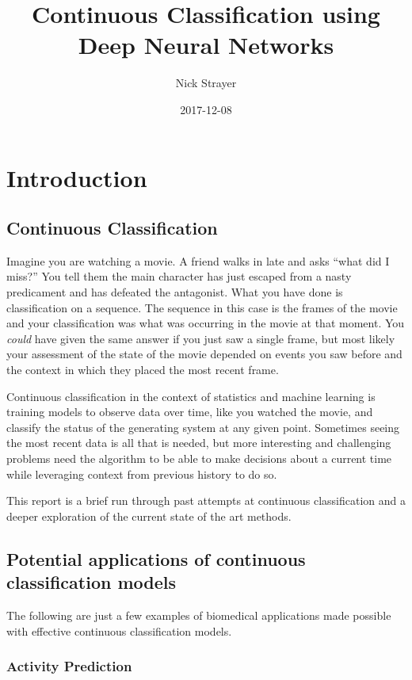 \documentclass[]{book}
\title{Continuous Classification using Deep Neural Networks}
\author{Nick Strayer}
\date{2017-12-08}
\theoremstyle{definition}
\theoremstyle{definition}
\theoremstyle{definition}
\theoremstyle{remark}
\begin{document}
\maketitle

{
\setcounter{tocdepth}{1}
\tableofcontents
}
\chapter{Introduction}\label{intro}

\section{Continuous Classification}\label{continuous-classification}

Imagine you are watching a movie. A friend walks in late and asks ``what
did I miss?'' You tell them the main character has just escaped from a
nasty predicament and has defeated the antagonist. What you have done is
classification on a sequence. The sequence in this case is the frames of
the movie and your classification was what was occurring in the movie at
that moment. You \emph{could} have given the same answer if you just saw
a single frame, but most likely your assessment of the state of the
movie depended on events you saw before and the context in which they
placed the most recent frame.

Continuous classification in the context of statistics and machine
learning is training models to observe data over time, like you watched
the movie, and classify the status of the generating system at any given
point. Sometimes seeing the most recent data is all that is needed, but
more interesting and challenging problems need the algorithm to be able
to make decisions about a current time while leveraging context from
previous history to do so.

This report is a brief run through past attempts at continuous
classification and a deeper exploration of the current state of the art
methods.

\section{Potential applications of continuous classification
models}\label{potential-applications-of-continuous-classification-models}

The following are just a few examples of biomedical applications made
possible with effective continuous classification models.

\subsection{Activity Prediction}\label{activity-prediction}
\end{document}
